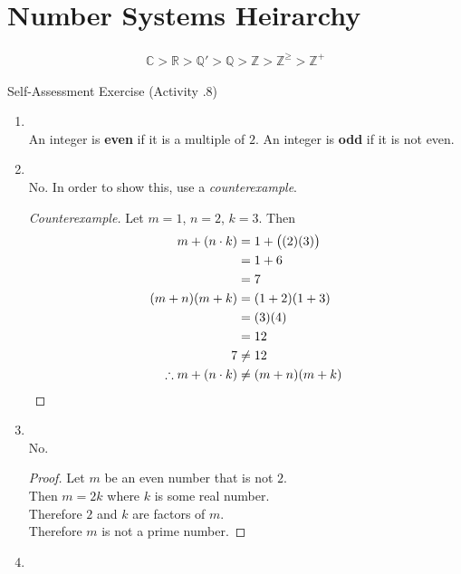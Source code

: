 \documentclass[../notes.tex]{subfiles}
\begin{document}
		\section{Number Systems Heirarchy}
			\begin{align*}
				\mathbb{C} > \mathbb{R} > \mathbb{Q}' > \mathbb{Q} > \mathbb{Z} > \mathbb{Z}^{\geq} > \mathbb{Z}^{+}
			\end{align*}
			\pagebreak
			\begin{exercise}{Self-Assessment Exercise (Activity \thechapter.8)}
				\begin{enumerate}
					\item {}\\
						An integer is \textbf{even} if it is a multiple of $2$. An integer is \textbf{odd} if it is not even.
					\item {}\\
						No. In order to show this, use a \textit{counterexample}.
						\begin{proof}[Counterexample]
							Let $m = 1$, $n = 2$, $k = 3$. Then
							\begin{align*}
								m + (n \cdot k) &= 1 + \bigl((2)(3)\bigr)\\
								&= 1 + 6\\
								&= 7\\
								(m + n)(m + k) &= (1 + 2)(1 + 3)\\
								&= (3)(4)\\
								&= 12\\
								7 &\neq 12\\
								\therefore m + (n \cdot k) &\neq (m + n)(m + k) \qedhere
							\end{align*}
						\end{proof}
					\item {}\\
					No.
					\begin{proof}
						Let $m$ be an even number that is not $2$.\\
						Then $m = 2k$ where $k$ is some real number.\\
						Therefore $2$ and $k$ are factors of $m$.\\
						Therefore $m$ is not a prime number.
					\end{proof}
					\item {}\\

\end{enumerate}
\end{exercise}
\end{document}
